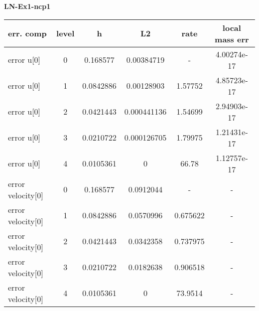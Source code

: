 \documentclass{amsart}
\begin{document}
\begin{center}   
{\bf LN-Ex1-ncp1 }\end{center}  
\tableofcontents

\begin{table}[h!]
\begin{tabular}{|l|c|c|c|c|c|}
\hline
err. comp & level & h  & L2 & rate  & local mass err \\ 
\hline
error u[0] & 0 & 0.168577  & 0.00384719  & -   &  4.00274e-17 \\ 
error u[0] & 1 & 0.0842886 & 0.00128903  & 1.57752   &  4.85723e-17 \\ 
error u[0] & 2 & 0.0421443 & 0.000441136 & 1.54699   &  2.94903e-17 \\ 
error u[0] & 3 & 0.0210722 & 0.000126705 & 1.79975   &  1.21431e-17 \\ 
error u[0] & 4 & 0.0105361 & 0 & 66.78   &  1.12757e-17 \\ 
error velocity[0] & 0 & 0.168577  & 0.0912044 & -   & - \\ 
error velocity[0] & 1 & 0.0842886 & 0.0570996 & 0.675622   & - \\ 
error velocity[0] & 2 & 0.0421443 & 0.0342358 & 0.737975   & - \\ 
error velocity[0] & 3 & 0.0210722 & 0.0182638 & 0.906518   & - \\ 
error velocity[0] & 4 & 0.0105361 & 0 & 73.9514   & - \\ 

\hline
\end{tabular}
\end{table}
\end{document}
